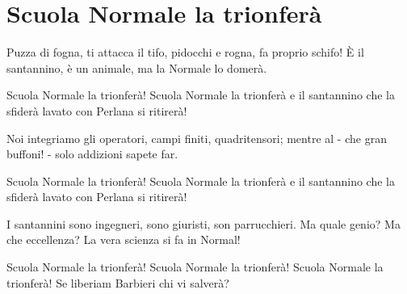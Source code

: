 \section{Scuola Normale la trionferà}
\begin{canzone}
Puzza di fogna, ti attacca il tifo,
pidocchi e rogna, fa proprio schifo!
È il santannino, è un animale,
ma la Normale lo domerà.

Scuola Normale la trionferà!
Scuola Normale la trionferà
e il santannino che la sfiderà
lavato con Perlana si ritirerà!

Noi integriamo gli operatori,
campi finiti, quadritensori;
mentre al \santanna - che gran buffoni! - 
solo addizioni sapete far.

Scuola Normale la trionferà!
Scuola Normale la trionferà
e il santannino che la sfiderà
lavato con Perlana si ritirerà!

\clearpage
I santannini sono ingegneri,
sono giuristi, son parrucchieri.
Ma quale genio? Ma che eccellenza?
La vera scienza si fa in Normal!

Scuola Normale la trionferà!
Scuola Normale la trionferà!
Scuola Normale la trionferà!
Se liberiam Barbieri chi vi salverà?
\end{canzone}
